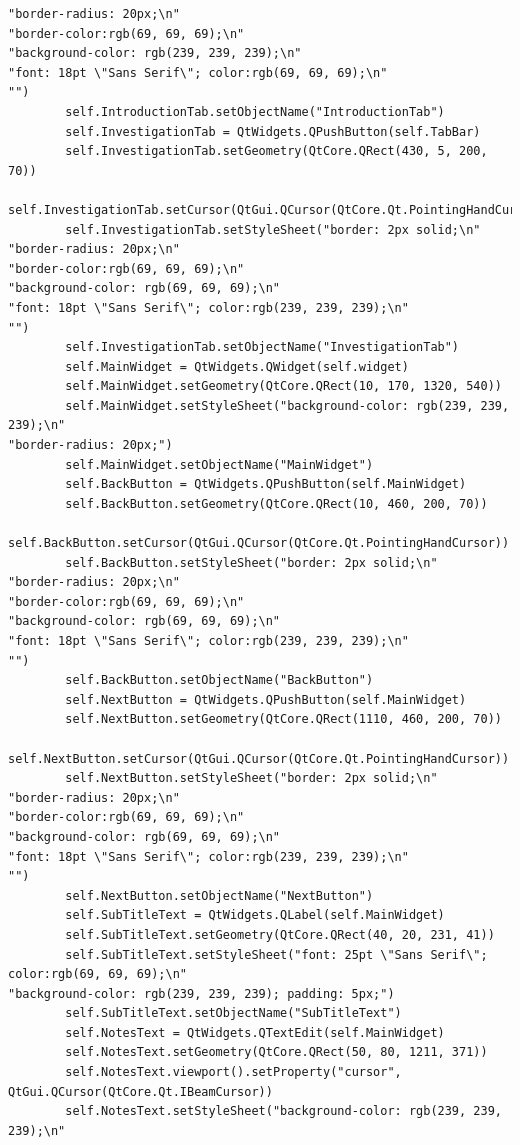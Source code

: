 \documentclass{article}
\begin{document}
\begin{lstlisting}
"border-radius: 20px;\n"
"border-color:rgb(69, 69, 69);\n"
"background-color: rgb(239, 239, 239);\n"
"font: 18pt \"Sans Serif\"; color:rgb(69, 69, 69);\n"
"")
        self.IntroductionTab.setObjectName("IntroductionTab")
        self.InvestigationTab = QtWidgets.QPushButton(self.TabBar)
        self.InvestigationTab.setGeometry(QtCore.QRect(430, 5, 200, 70))
        self.InvestigationTab.setCursor(QtGui.QCursor(QtCore.Qt.PointingHandCursor))
        self.InvestigationTab.setStyleSheet("border: 2px solid;\n"
"border-radius: 20px;\n"
"border-color:rgb(69, 69, 69);\n"
"background-color: rgb(69, 69, 69);\n"
"font: 18pt \"Sans Serif\"; color:rgb(239, 239, 239);\n"
"")
        self.InvestigationTab.setObjectName("InvestigationTab")
        self.MainWidget = QtWidgets.QWidget(self.widget)
        self.MainWidget.setGeometry(QtCore.QRect(10, 170, 1320, 540))
        self.MainWidget.setStyleSheet("background-color: rgb(239, 239, 239);\n"
"border-radius: 20px;")
        self.MainWidget.setObjectName("MainWidget")
        self.BackButton = QtWidgets.QPushButton(self.MainWidget)
        self.BackButton.setGeometry(QtCore.QRect(10, 460, 200, 70))
        self.BackButton.setCursor(QtGui.QCursor(QtCore.Qt.PointingHandCursor))
        self.BackButton.setStyleSheet("border: 2px solid;\n"
"border-radius: 20px;\n"
"border-color:rgb(69, 69, 69);\n"
"background-color: rgb(69, 69, 69);\n"
"font: 18pt \"Sans Serif\"; color:rgb(239, 239, 239);\n"
"")
        self.BackButton.setObjectName("BackButton")
        self.NextButton = QtWidgets.QPushButton(self.MainWidget)
        self.NextButton.setGeometry(QtCore.QRect(1110, 460, 200, 70))
        self.NextButton.setCursor(QtGui.QCursor(QtCore.Qt.PointingHandCursor))
        self.NextButton.setStyleSheet("border: 2px solid;\n"
"border-radius: 20px;\n"
"border-color:rgb(69, 69, 69);\n"
"background-color: rgb(69, 69, 69);\n"
"font: 18pt \"Sans Serif\"; color:rgb(239, 239, 239);\n"
"")
        self.NextButton.setObjectName("NextButton")
        self.SubTitleText = QtWidgets.QLabel(self.MainWidget)
        self.SubTitleText.setGeometry(QtCore.QRect(40, 20, 231, 41))
        self.SubTitleText.setStyleSheet("font: 25pt \"Sans Serif\"; color:rgb(69, 69, 69);\n"
"background-color: rgb(239, 239, 239); padding: 5px;")
        self.SubTitleText.setObjectName("SubTitleText")
        self.NotesText = QtWidgets.QTextEdit(self.MainWidget)
        self.NotesText.setGeometry(QtCore.QRect(50, 80, 1211, 371))
        self.NotesText.viewport().setProperty("cursor", QtGui.QCursor(QtCore.Qt.IBeamCursor))
        self.NotesText.setStyleSheet("background-color: rgb(239, 239, 239);\n"

\end{lstlisting}
\end{document}
